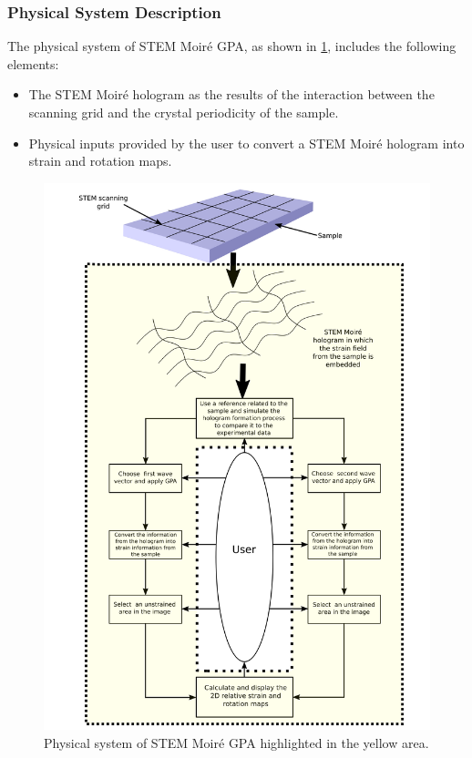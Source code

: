 \documentclass[12pt]{article}
\newcommand{\progname}{STEM Moir{\'e} GPA}
\begin{document}
\subsubsection{Physical System Description}

The physical system of \progname{}, as shown in \cref{fig:system_description}, includes the following elements:
\begin{itemize}
\item The STEM Moir{\'e} hologram as the results of the interaction between the scanning grid and the crystal periodicity of the sample.
\item Physical inputs provided by the user to convert a STEM Moir{\'e} hologram into strain and rotation maps.
\end{itemize}

\begin{figure}[H]
\begin{center}
\includegraphics[scale=0.65]{Figures/System_description.png}
\caption{Physical system of \progname{} highlighted in the yellow area.}
\label{fig:system_description}
\end{center}
\end{figure}
\end{document}
